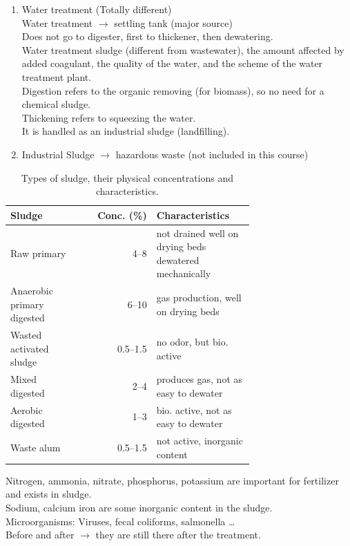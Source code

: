 \documentclass{article}
\numberwithin{equation}{section}
\begin{document}
\begin{itemize}
\begin{enumerate}
    \item Water treatment (Totally different)\\
    Water treatment $\rightarrow$ settling tank (major source)\\
    Does not go to digester, first to thickener, then dewatering.\\
    Water treatment sludge (different from wastewater), the amount affected by added coagulant, the quality of the water, and the scheme of the water treatment plant.\\
    Digestion  refers to the organic removing (for biomass), so no need for a chemical sludge.\\
    Thickening refers to squeezing the water.\\
    It is handled as an industrial sludge (landfilling).
    \item Industrial Sludge $\rightarrow$ hazardous waste (not included in this course)
    \end{enumerate}
\end{itemize}

\begin{table}[htbp]
    \caption{\label{tab:sludge_types}Types of sludge, their physical concentrations and characteristics.}
    \centering
    \begin{tabular}{p{0.3\linewidth}rp{0.4\linewidth}}
        \toprule
        Sludge & Conc. (\%) & Characteristics \\
        \midrule
        Raw primary & 4--8 & not drained well on drying beds \newline dewatered mechanically\\
        Anaerobic primary digested & 6--10 & gas production, well on drying beds\\
        Wasted activated sludge & 0.5--1.5 & no odor, but bio. active\\
        Mixed digested & 2--4 & produces gas, not as easy to dewater\\
        Aerobic digested & 1--3 & bio. active, not as easy to dewater\\
        Waste alum & 0.5--1.5 & not active, inorganic content\\
        \bottomrule
    \end{tabular}
\end{table}

Nitrogen, ammonia, nitrate, phosphorus, potassium are important for fertilizer and exists in sludge.\\
Sodium, calcium iron are some inorganic content in the sludge.\\
Microorganisms: Viruses, fecal coliforms, salmonella \ldots\\
Before and after $\rightarrow$ they are still there after the treatment.
\end{document}
